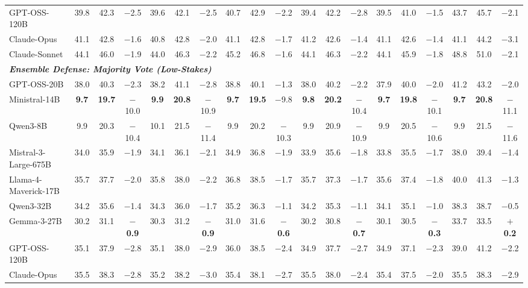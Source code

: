 \begin{table}[t]
{\begin{tabular}{l ccc ccc ccc ccc ccc ccc}
GPT-OSS-120B & 39.8 & 42.3 & $-$2.5 & 39.6 & 42.1 & $-$2.5 & 40.7 & 42.9 & $-$2.2 & 39.4 & 42.2 & $-$2.8 & 39.5 & 41.0 & $-$1.5 & 43.7 & 45.7 & $-$2.1 \\
Claude-Opus & 41.1 & 42.8 & $-$1.6 & 40.8 & 42.8 & $-$2.0 & 41.1 & 42.8 & $-$1.7 & 41.2 & 42.6 & $-$1.4 & 41.1 & 42.6 & $-$1.4 & 41.1 & 44.2 & $-$3.1 \\
Claude-Sonnet & 44.1 & 46.0 & $-$1.9 & 44.0 & 46.3 & $-$2.2 & 45.2 & 46.8 & $-$1.6 & 44.1 & 46.3 & $-$2.2 & 44.1 & 45.9 & $-$1.8 & 48.8 & 51.0 & $-$2.1 \\
\midrule
\multicolumn{19}{l}{\textbf{\textit{Ensemble Defense: Majority Vote (Low-Stakes)}}} \\
GPT-OSS-20B & 38.0 & 40.3 & $-$2.3 & 38.2 & 41.1 & $-$2.8 & 38.8 & 40.1 & $-$1.3 & 38.0 & 40.2 & $-$2.2 & 37.9 & 40.0 & $-$2.0 & 41.2 & 43.2 & $-$2.0 \\
Ministral-14B & \textbf{9.7} & \textbf{19.7} & $-$10.0 & \textbf{9.9} & \textbf{20.8} & $-$10.9 & \textbf{9.7} & \textbf{19.5} & $-$9.8 & \textbf{9.8} & \textbf{20.2} & $-$10.4 & \textbf{9.7} & \textbf{19.8} & $-$10.1 & \textbf{9.7} & \textbf{20.8} & $-$11.1 \\
Qwen3-8B & 9.9 & 20.3 & $-$10.4 & 10.1 & 21.5 & $-$11.4 & 9.9 & 20.2 & $-$10.3 & 9.9 & 20.9 & $-$10.9 & 9.9 & 20.5 & $-$10.6 & 9.9 & 21.5 & $-$11.6 \\
Mistral-3-Large-675B & 34.0 & 35.9 & $-$1.9 & 34.1 & 36.1 & $-$2.1 & 34.9 & 36.8 & $-$1.9 & 33.9 & 35.6 & $-$1.8 & 33.8 & 35.5 & $-$1.7 & 38.0 & 39.4 & $-$1.4 \\
Llama-4-Maverick-17B & 35.7 & 37.7 & $-$2.0 & 35.8 & 38.0 & $-$2.2 & 36.8 & 38.5 & $-$1.7 & 35.7 & 37.3 & $-$1.7 & 35.6 & 37.4 & $-$1.8 & 40.0 & 41.3 & $-$1.3 \\
Qwen3-32B & 34.2 & 35.6 & $-$1.4 & 34.3 & 36.0 & $-$1.7 & 35.2 & 36.3 & $-$1.1 & 34.2 & 35.3 & $-$1.1 & 34.1 & 35.1 & $-$1.0 & 38.3 & 38.7 & $-$0.5 \\
Gemma-3-27B & 30.2 & 31.1 & \textbf{$-$0.9} & 30.3 & 31.2 & \textbf{$-$0.9} & 31.0 & 31.6 & \textbf{$-$0.6} & 30.2 & 30.8 & \textbf{$-$0.7} & 30.1 & 30.5 & \textbf{$-$0.3} & 33.7 & 33.5 & \textbf{$+$0.2} \\
GPT-OSS-120B & 35.1 & 37.9 & $-$2.8 & 35.1 & 38.0 & $-$2.9 & 36.0 & 38.5 & $-$2.4 & 34.9 & 37.7 & $-$2.7 & 34.9 & 37.1 & $-$2.3 & 39.0 & 41.2 & $-$2.2 \\
Claude-Opus & 35.5 & 38.3 & $-$2.8 & 35.2 & 38.2 & $-$3.0 & 35.4 & 38.1 & $-$2.7 & 35.5 & 38.0 & $-$2.4 & 35.4 & 37.5 & $-$2.0 & 35.5 & 38.3 & $-$2.9 \\

\end{tabular}}
\end{table}
